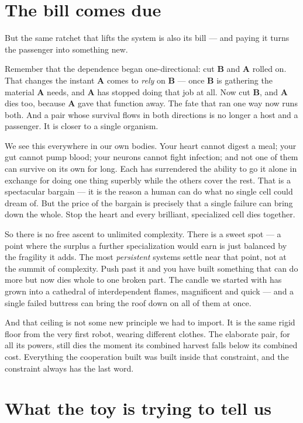\documentclass{article}
\begin{document}
\section*{The bill comes due}

But the same ratchet that lifts the system is also its bill --- and paying it turns the passenger into something new.

Remember that the dependence began one-directional: cut \textbf{B} and \textbf{A} rolled on. That changes the instant \textbf{A} comes to \emph{rely} on \textbf{B} --- once \textbf{B} is gathering the material \textbf{A} needs, and \textbf{A} has stopped doing that job at all. Now cut \textbf{B}, and \textbf{A} dies too, because \textbf{A} gave that function away. The fate that ran one way now runs both. And a pair whose survival flows in both directions is no longer a host and a passenger. It is closer to a single organism.

We see this everywhere in our own bodies. Your heart cannot digest a meal; your gut cannot pump blood; your neurons cannot fight infection; and not one of them can survive on its own for long. Each has surrendered the ability to go it alone in exchange for doing one thing superbly while the others cover the rest. That is a spectacular bargain --- it is the reason a human can do what no single cell could dream of. But the price of the bargain is precisely that a single failure can bring down the whole. Stop the heart and every brilliant, specialized cell dies together.

So there is no free ascent to unlimited complexity. There is a sweet spot --- a point where the surplus a further specialization would earn is just balanced by the fragility it adds. The most \emph{persistent} systems settle near that point, not at the summit of complexity. Push past it and you have built something that can do more but now dies whole to one broken part. The candle we started with has grown into a cathedral of interdependent flames, magnificent and quick --- and a single failed buttress can bring the roof down on all of them at once.

And that ceiling is not some new principle we had to import. It is the same rigid floor from the very first robot, wearing different clothes. The elaborate pair, for all its powers, still dies the moment its combined harvest falls below its combined cost. Everything the cooperation built was built inside that constraint, and the constraint always has the last word.

\section*{What the toy is trying to tell us}
\end{document}

